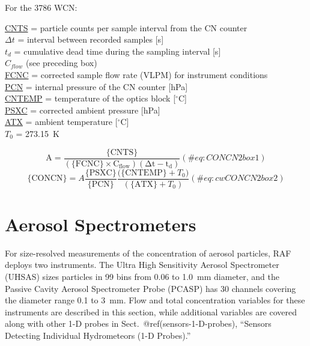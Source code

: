 \documentclass[
  english,
]{book}
\newcommand{\textgreek}[2][]{\foreignlanguage{greek}{#2}}
\begin{document}
For the 3786 WCN:

\protect\hyperlink{cnts}{CNTS} = particle counts per sample interval
from the CN counter\\
\(\Delta t\) = interval
between recorded samples {[}s{]}\\
\(t_{d}\) = cumulative dead time during the sampling interval {[}s{]}\\
\(C_{flow}\) (see preceding box)\\
\protect\hyperlink{fcnc}{FCNC} = corrected sample flow rate (VLPM) for
instrument conditions\\
\protect\hyperlink{pcn}{PCN} = internal pressure of the CN counter
{[}hPa{]}\\
\protect\hyperlink{cntemp}{CNTEMP} = temperature of the optics block
{[}\(^{\circ}\)C{]}\\
\href{./4-the-state-of-the-atmosphere.html\#psx}{PSXC} = corrected
ambient pressure {[}hPa{]}\\
\href{./4-the-state-of-the-atmosphere.html\#ambient-t}{ATX} = ambient
temperature {[}\(^{\circ}\)C{]}\\
\(T_{0}\) = 273.15~K

\begin{equation}
\mathrm{A=\frac{\{CNTS\}}{\mathrm{(\{FCNC\}\times C_{flow})}(\Delta t-t_{d})}}
(\#eq:CONCN2box1)
\end{equation} \begin{equation}
\mathrm{\{CONCN\}}=A\frac{\mathrm{\{PSXC\}}}{\mathrm{\{PCN\}}}\frac{\mathrm{(\{CNTEMP\}}+T_{0})}{(\mathrm{\{ATX\}}+T_{0})}
(\#eq:cwCONCN2box2)
\end{equation}

\hypertarget{aerosol-spec}{%
\section{Aerosol Spectrometers}\label{aerosol-spec}}

For size-resolved measurements of the concentration of aerosol
particles, RAF deploys two instruments. The Ultra High Sensitivity
Aerosol Spectrometer (UHSAS) sizes particles in 99 bins from 0.06 to
1.0~\textgreek{m}m diameter, and the Passive Cavity Aerosol Spectrometer
Probe (PCASP) has 30 channels covering the diameter range 0.1 to
3~\textgreek{m}m. Flow and total concentration variables for these
instruments are described in this section, while additional variables
are covered along with other 1-D probes in
Sect.~@ref(sensors-1-D-probes), ``Sensors Detecting Individual
Hydrometeors (1-D Probes).''
\end{document}
